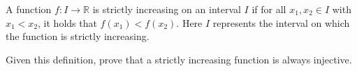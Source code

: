\documentclass[a4paper]{exam}
\theoremstyle{definition}
\newcommand\R{\ensuremath{\mathbb{R}}}
\begin{document}
\begin{questions}

\question A function \(f: I \rightarrow \R\) is strictly increasing on an interval \(I\) if for all \(x_1, x_2 \in I\) with \(x_1 < x_2\), it holds that \(f(x_1) < f(x_2)\). Here $I$ represents the interval on which the function is strictly increasing.
  
  Given this definition, prove that a strictly increasing function is always injective.

  \begin{solution}
  \end{solution}
\end{questions}
\end{document}
